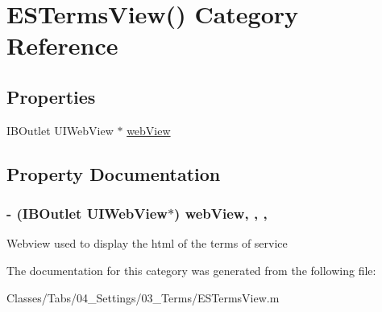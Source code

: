 \hypertarget{category_e_s_terms_view_07_08}{}\section{E\+S\+Terms\+View() Category Reference}
\label{category_e_s_terms_view_07_08}
\subsection*{Properties}
\begin{DoxyCompactItemize}
\item 
I\+B\+Outlet U\+I\+Web\+View $\ast$ \hyperlink{category_e_s_terms_view_07_08_a7074a48b924d68762ef3901cfca9f7f9}{web\+View}
\end{DoxyCompactItemize}


\subsection{Property Documentation}
\hypertarget{category_e_s_terms_view_07_08_a7074a48b924d68762ef3901cfca9f7f9}{}
\subsubsection[{web\+View}]{\setlength{\rightskip}{0pt plus 5cm}-\/ (I\+B\+Outlet U\+I\+Web\+View$\ast$) web\+View\hspace{0.3cm}{\ttfamily [read]}, {\ttfamily [write]}, {\ttfamily [nonatomic]}, {\ttfamily [strong]}}\label{category_e_s_terms_view_07_08_a7074a48b924d68762ef3901cfca9f7f9}
Webview used to display the html of the terms of service 

The documentation for this category was generated from the following file\+:\begin{DoxyCompactItemize}
\item 
Classes/\+Tabs/04\+\_\+\+Settings/03\+\_\+\+Terms/E\+S\+Terms\+View.\+m\end{DoxyCompactItemize}
